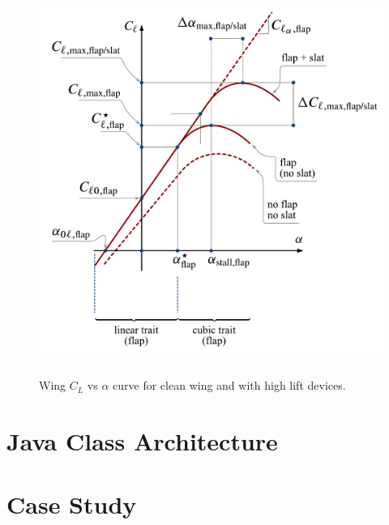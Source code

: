 \begin{figure}[H]
\centering
{\includegraphics[height=12cm]{Immagini/Airfoil_Cl_Vs_alpha_curve_flap_slat.pdf}} 
\caption{Wing $C_L$ vs $\alpha$ curve for clean wing and with high lift devices.}
\label{fig:clalfahl}
\end{figure}



\section{Java Class Architecture}

\section{Case Study}
